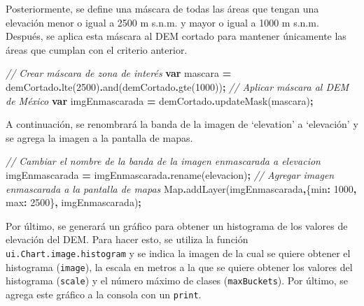 \documentclass[
  12pt,
  letterpaper,
  twoside]{book}
\newenvironment{Shaded}{\begin{snugshade}}{\end{snugshade}}
\newcommand{\BuiltInTok}[1]{#1}
\newcommand{\CommentTok}[1]{\textcolor[rgb]{0.56,0.35,0.01}{\textit{#1}}}
\newcommand{\DataTypeTok}[1]{\textcolor[rgb]{0.13,0.29,0.53}{#1}}
\newcommand{\DecValTok}[1]{\textcolor[rgb]{0.00,0.00,0.81}{#1}}
\newcommand{\FunctionTok}[1]{\textcolor[rgb]{0.00,0.00,0.00}{#1}}
\newcommand{\KeywordTok}[1]{\textcolor[rgb]{0.13,0.29,0.53}{\textbf{#1}}}
\newcommand{\NormalTok}[1]{#1}
\newcommand{\OperatorTok}[1]{\textcolor[rgb]{0.81,0.36,0.00}{\textbf{#1}}}
\newcommand{\StringTok}[1]{\textcolor[rgb]{0.31,0.60,0.02}{#1}}
\begin{document}
Posteriormente, se define una máscara de todas las áreas que tengan una elevación menor o igual a 2500 m s.n.m. y mayor o igual a 1000 m s.n.m. Después, se aplica esta máscara al DEM cortado para mantener únicamente las áreas que cumplan con el criterio anterior.

\begin{Shaded}
\begin{Highlighting}[]
\CommentTok{// Crear máscara de zona de interés}
\KeywordTok{var}\NormalTok{ mascara }\OperatorTok{=}\NormalTok{ demCortado}\OperatorTok{.}\FunctionTok{lte}\NormalTok{(}\DecValTok{2500}\NormalTok{)}\OperatorTok{.}\FunctionTok{and}\NormalTok{(demCortado}\OperatorTok{.}\FunctionTok{gte}\NormalTok{(}\DecValTok{1000}\NormalTok{))}\OperatorTok{;}
\CommentTok{// Aplicar máscara al DEM de México}
\KeywordTok{var}\NormalTok{ imgEnmascarada }\OperatorTok{=}\NormalTok{ demCortado}\OperatorTok{.}\FunctionTok{updateMask}\NormalTok{(mascara)}\OperatorTok{;}
\end{Highlighting}
\end{Shaded}

A continuación, se renombrará la banda de la imagen de `elevation' a `elevación' y se agrega la imagen a la pantalla de mapas.

\begin{Shaded}
\begin{Highlighting}[]
\CommentTok{// Cambiar el nombre de la banda de la imagen enmascarada a elevacion}
\NormalTok{imgEnmascarada }\OperatorTok{=}\NormalTok{ imgEnmascarada}\OperatorTok{.}\FunctionTok{rename}\NormalTok{(}\StringTok{\textquotesingle{}elevacion\textquotesingle{}}\NormalTok{)}\OperatorTok{;}
\CommentTok{// Agregar imagen enmascarada a la pantalla de mapas}
\BuiltInTok{Map}\OperatorTok{.}\FunctionTok{addLayer}\NormalTok{(imgEnmascarada}\OperatorTok{,}\NormalTok{\{}\DataTypeTok{min}\OperatorTok{:} \DecValTok{1000}\OperatorTok{,} \DataTypeTok{max}\OperatorTok{:} \DecValTok{2500}\NormalTok{\}}\OperatorTok{,} \StringTok{\textquotesingle{}imgEnmascarada\textquotesingle{}}\NormalTok{)}\OperatorTok{;}
\end{Highlighting}
\end{Shaded}

Por último, se generará un gráfico para obtener un histograma de los valores de elevación del DEM. Para hacer esto, se utiliza la función \texttt{ui.Chart.image.histogram} y se indica la imagen de la cual se quiere obtener el histograma (\texttt{image}), la escala en metros a la que se quiere obtener los valores del histograma (\texttt{scale}) y el número máximo de clases (\texttt{maxBuckets}). Por último, se agrega este gráfico a la consola con un \texttt{print}.
\end{document}
